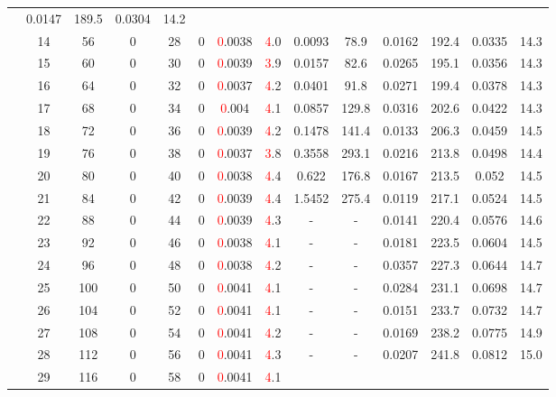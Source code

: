 \begin{table}[htb]
{\begin{tabular}{|c|c|c|c|c|c|c|c|c|c|c|c|c|c|}
 & 0.0147 & 189.5
 & 0.0304 & 14.2
 \\
 & 
14 & 56 & 0 & 28 & 0
 & \textcolor{red}0.0038 & \textcolor{red}4.0
 & 0.0093 & 78.9
 & 0.0162 & 192.4
 & 0.0335 & 14.3
 \\
 & 
15 & 60 & 0 & 30 & 0
 & \textcolor{red}0.0039 & \textcolor{red}3.9
 & 0.0157 & 82.6
 & 0.0265 & 195.1
 & 0.0356 & 14.3
 \\
 & 
16 & 64 & 0 & 32 & 0
 & \textcolor{red}0.0037 & \textcolor{red}4.2
 & 0.0401 & 91.8
 & 0.0271 & 199.4
 & 0.0378 & 14.3
 \\
 & 
17 & 68 & 0 & 34 & 0
 & \textcolor{red}0.004 & \textcolor{red}4.1
 & 0.0857 & 129.8
 & 0.0316 & 202.6
 & 0.0422 & 14.3
 \\
 & 
18 & 72 & 0 & 36 & 0
 & \textcolor{red}0.0039 & \textcolor{red}4.2
 & 0.1478 & 141.4
 & 0.0133 & 206.3
 & 0.0459 & 14.5
 \\
 & 
19 & 76 & 0 & 38 & 0
 & \textcolor{red}0.0037 & \textcolor{red}3.8
 & 0.3558 & 293.1
 & 0.0216 & 213.8
 & 0.0498 & 14.4
 \\
 & 
20 & 80 & 0 & 40 & 0
 & \textcolor{red}0.0038 & \textcolor{red}4.4
 & 0.622 & 176.8
 & 0.0167 & 213.5
 & 0.052 & 14.5
 \\
 & 
21 & 84 & 0 & 42 & 0
 & \textcolor{red}0.0039 & \textcolor{red}4.4
 & 1.5452 & 275.4
 & 0.0119 & 217.1
 & 0.0524 & 14.5
 \\
 & 
22 & 88 & 0 & 44 & 0
 & \textcolor{red}0.0039 & \textcolor{red}4.3
 & - & -
 & 0.0141 & 220.4
 & 0.0576 & 14.6
 \\
 & 
23 & 92 & 0 & 46 & 0
 & \textcolor{red}0.0038 & \textcolor{red}4.1
 & - & -
 & 0.0181 & 223.5
 & 0.0604 & 14.5
 \\
 & 
24 & 96 & 0 & 48 & 0
 & \textcolor{red}0.0038 & \textcolor{red}4.2
 & - & -
 & 0.0357 & 227.3
 & 0.0644 & 14.7
 \\
 & 
25 & 100 & 0 & 50 & 0
 & \textcolor{red}0.0041 & \textcolor{red}4.1
 & - & -
 & 0.0284 & 231.1
 & 0.0698 & 14.7
 \\
 & 
26 & 104 & 0 & 52 & 0
 & \textcolor{red}0.0041 & \textcolor{red}4.1
 & - & -
 & 0.0151 & 233.7
 & 0.0732 & 14.7
 \\
 & 
27 & 108 & 0 & 54 & 0
 & \textcolor{red}0.0041 & \textcolor{red}4.2
 & - & -
 & 0.0169 & 238.2
 & 0.0775 & 14.9
 \\
 & 
28 & 112 & 0 & 56 & 0
 & \textcolor{red}0.0041 & \textcolor{red}4.3
 & - & -
 & 0.0207 & 241.8
 & 0.0812 & 15.0
 \\
 & 
29 & 116 & 0 & 58 & 0
 & \textcolor{red}0.0041 & \textcolor{red}4.1

\end{tabular}}
\end{table}
